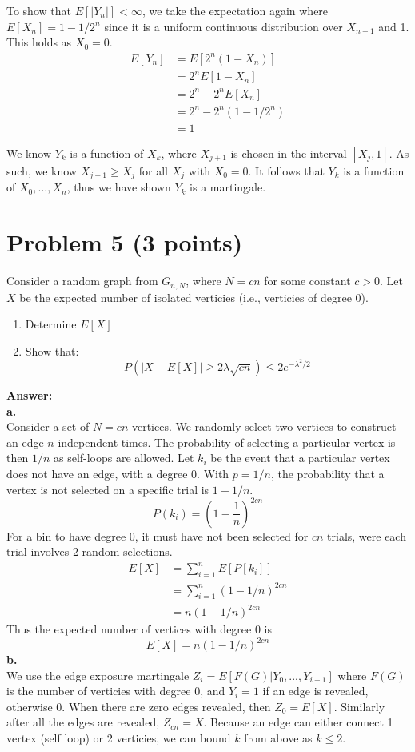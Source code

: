 \documentclass[letterpaper, 11pt]{article}
\begin{document}
To show that $E[|Y_n|] < \infty$, we take the expectation again where $E[X_n] = 1-1/2^n$ since it is a uniform continuous distribution over $X_{n-1}$ and 1. This holds as $X_0 = 0$.
\begin{align*}
E[Y_n] &= E[2^n(1-X_n)] \\
&= 2^nE[1-X_n] \\
&= 2^n-2^nE[X_n] \\
&=2^n - 2^n(1-1/2^n) \\
&= 1
\end{align*}

We know $Y_k$ is a function of $X_k$, where $X_{j+1}$ is chosen in the interval $[X_j,1]$. As such, we know $X_{j+1} \geq X_j$ for all $X_j$ with $X_0 = 0$. It follows that $Y_k$ is a function of $X_0,...,X_n$, thus we have shown $Y_k$ is a martingale.

\pagebreak
\section*{Problem 5 (3 points)}
Consider a random graph from $G_{n,N}$, where $N=cn$ for some constant $c>0$. Let $X$ be the expected number of isolated verticies (i.e., verticies of degree 0).
\begin{enumerate}
	\item Determine $E[X]$
	\item Show that:
		$$ P(|X-E[X]| \geq 2\lambda \sqrt{cn}) \leq 2e^{- \lambda^2/2}$$
\end{enumerate}
\textbf{Answer:} \\
\textbf{a.}\\
Consider a set of $N=cn$ vertices. We randomly select two vertices to construct an edge $n$ independent times. The probability of selecting a particular vertex is then $1/n$ as self-loops are allowed. Let $k_i$ be the event that a particular vertex does not have an edge, with a degree 0. With $p=1/n$, the probability that a vertex is not selected on a specific trial is $1-1/n$.
$$P(k_i) = \left(1-\frac{1}{n}\right)^{2cn}$$
For a bin to have degree 0, it must have not been selected for $cn$ trials, were each trial involves 2 random selections.
\begin{align*}
E[X] &= \sum_{i=1}^nE[P[k_i]] \\
&= \sum_{i=1}^n(1-1/n)^{2cn} \\
&= n(1-1/n)^{2cn}
\end{align*}
Thus the expected number of vertices with degree 0 is 
$$E[X] = n(1-1/n)^{2cn}$$
\textbf{b.}\\
We use the edge exposure martingale $Z_i=E[F(G)|Y_0,...,Y_{i-1}]$ where $F(G)$ is the number of verticies with degree 0, and $Y_i = 1$ if an edge is revealed, otherwise 0. When there are zero edges revealed, then $Z_0=E[X]$. Similarly after all the edges are revealed,  $Z_{cn} = X$. Because an edge can either connect 1 vertex (self loop) or 2 verticies, we can bound $k$ from above as $k \leq 2$.
\end{document}
